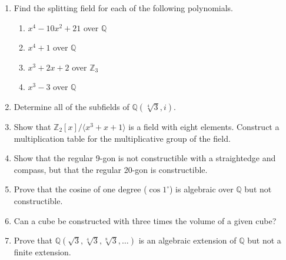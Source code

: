 {\begin{enumerate}
\begin{enumerate}
 \item
${\mathbb Q}( \sqrt{2} + \sqrt{5}\, )$ over ${\mathbb Q} ( \sqrt{5}\, )$

 \item
${\mathbb Q}( \sqrt{2}, \sqrt{6} + \sqrt{10}\, )$ over ${\mathbb Q} ( \sqrt{3}
+ \sqrt{5}\, )$

\end{enumerate}



\item
Find the splitting field for each of the following polynomials.
\begin{multicols}{2}
\begin{enumerate}

\item
$x^4 - 10 x^2 + 21$ over ${\mathbb Q}$

\item
$x^4 + 1$ over ${\mathbb Q}$

\item
$x^3 + 2x + 2$ over ${\mathbb Z}_3$

\item
$x^3 - 3$ over ${\mathbb Q}$


\end{enumerate}
\end{multicols}


\item
Determine all of the subfields of ${\mathbb Q}( \sqrt[4]{3}, i )$.

 
\item
Show that ${\mathbb Z}_2[x] / \langle x^3 + x + 1 \rangle$ is a field
with eight elements. Construct a multiplication table for the
multiplicative group of the field. 


\item
Show that the regular 9-gon is not constructible with a straightedge
and compass, but that the regular 20-gon is constructible.  
 

\item
Prove that the cosine of one degree ($\cos 1^\circ$) is algebraic over
${\mathbb Q}$ but not constructible.


\item
Can a cube be constructed with three times the volume of a given cube?




\item
Prove that ${\mathbb Q}(\sqrt{3}, \sqrt[4]{3}, \sqrt[8]{3}, \ldots )$ 
is an algebraic extension of ${\mathbb Q}$ but not a finite extension. 



\end{enumerate}}
